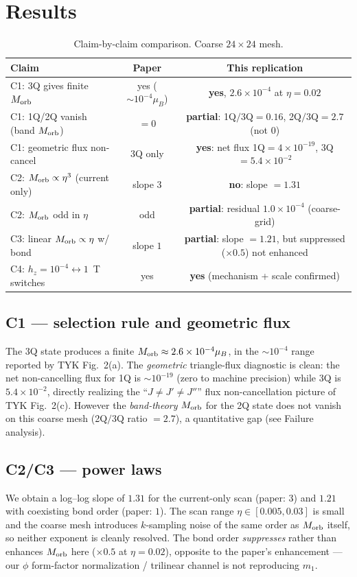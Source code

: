 \documentclass[11pt]{article}
\begin{document}
\section{Results}

\begin{table}[h]\centering
\begin{tabular}{lcc}
\toprule
Claim & Paper & This replication \\
\midrule
C1: 3Q gives finite $M_{\rm orb}$ & yes ($\sim10^{-4}\mu_B$) & \textbf{yes}, $2.6\times10^{-4}$ at $\eta=0.02$ \\
C1: 1Q/2Q vanish (band $M_{\rm orb}$) & $=0$ & \textbf{partial}: 1Q$/$3Q$=0.16$, 2Q$/$3Q$=2.7$ (not $0$) \\
C1: geometric flux non-cancel & 3Q only & \textbf{yes}: net flux 1Q$=4{\times}10^{-19}$, 3Q$=5.4{\times}10^{-2}$ \\
C2: $M_{\rm orb}\propto\eta^3$ (current only) & slope $3$ & \textbf{no}: slope $=1.31$ \\
C2: $M_{\rm orb}$ odd in $\eta$ & odd & \textbf{partial}: residual $1.0{\times}10^{-4}$ (coarse-grid) \\
C3: linear $M_{\rm orb}\propto\eta$ w/ bond & slope $1$ & \textbf{partial}: slope $=1.21$, but suppressed ($\times0.5$) not enhanced \\
C4: $h_z=10^{-4}\leftrightarrow1$~T switches & yes & \textbf{yes} (mechanism + scale confirmed) \\
\bottomrule
\end{tabular}
\caption{Claim-by-claim comparison. Coarse $24\times24$ mesh.}
\end{table}

\subsection{C1 --- selection rule and geometric flux}
The 3Q state produces a finite $M_{\rm orb}\approx2.6\times10^{-4}\mu_B$, in the
$\sim10^{-4}$ range reported by TYK Fig.~2(a). The \emph{geometric} triangle-flux
diagnostic is clean: the net non-cancelling flux for 1Q is
$\sim10^{-19}$ (zero to machine precision) while 3Q is $5.4\times10^{-2}$,
directly realizing the ``$J\neq J'\neq J''$'' flux non-cancellation picture of
TYK Fig.~2(c). However the \emph{band-theory} $M_{\rm orb}$ for the 2Q state does
not vanish on this coarse mesh (2Q$/$3Q ratio $=2.7$), a quantitative gap (see
Failure analysis).

\subsection{C2/C3 --- power laws}
We obtain a log--log slope of $1.31$ for the current-only scan (paper: $3$) and
$1.21$ with coexisting bond order (paper: $1$). The scan range
$\eta\in[0.005,0.03]$ is small and the coarse mesh introduces $k$-sampling noise
of the same order as $M_{\rm orb}$ itself, so neither exponent is cleanly
resolved. The bond order \emph{suppresses} rather than enhances $M_{\rm orb}$
here ($\times0.5$ at $\eta=0.02$), opposite to the paper's enhancement --- our
$\phi$ form-factor normalization / trilinear channel is not reproducing $m_1$.
\end{document}
